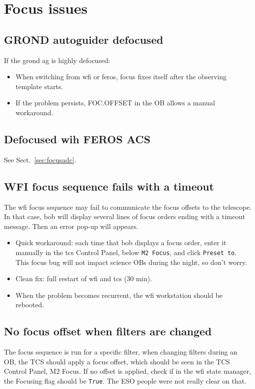 \documentclass[11pt,fleqn]{book} %
\begin{document}
\section{Focus issues}

\subsection{GROND autoguider defocused}

If the \gls{grond} \gls{ag} is highly defocused:
\begin{itemize}
  \item When switching from \gls{wfi} or \gls{feros}, focus fixes itself after the observing template starts.
  \item If the problem persists, FOC.OFFSET in the OB allows a manual workaround.
\end{itemize}

\subsection{Defocused wih FEROS ACS}

See Sect.~\ref{sec:focusadc}.

\subsection{WFI focus sequence fails with a timeout}
\label{sec:wfifocseq}
The \gls{wfi} focus sequence may fail to communicate the focus offsets to the telescope.  In that case, \gls{bob} will display several lines of focus orders ending with a timeout message. Then an error pop-up will appears.

\begin{itemize}
   \item Quick workaround: each time that \gls{bob} displays a focus order, enter it manually in the \gls{tcs} Control Panel, below \texttt{M2 Focus}, and click \texttt{Preset to}.  This focus bug will not impact science OBs during the night, so don't worry.
   \item Clean fix: full restart of \gls{wfi} and \gls{tcs} (30 min).
   \item When the problem becomes recurrent, the \gls{wfi} workstation should
be rebooted.
\end{itemize}

\subsection{No focus offset when filters are changed}
\label{sec:filfocoffset}
The focus sequence is run for a specific filter, when changing filters during an OB, the TCS should apply a focus offset, which should be seen in the TCS Control Panel, M2 Focus. If no offset is applied, check if in the \gls{wfi} state manager, the Focusing flag should be \texttt{True}. The ESO people were not really clear on that.
\end{document}
